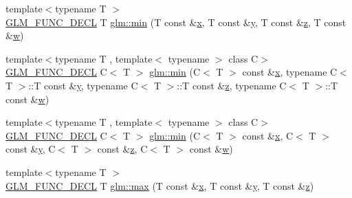 \begin{DoxyCompactItemize}
\item 
{\footnotesize template$<$typename T $>$ }\\\mbox{\hyperlink{setup_8hpp_ab2d052de21a70539923e9bcbf6e83a51}{G\+L\+M\+\_\+\+F\+U\+N\+C\+\_\+\+D\+E\+CL}} T \mbox{\hyperlink{group__gtx__extended__min__max_ga95466987024d03039607f09e69813d69}{glm\+::min}} (T const \&\mbox{\hyperlink{_s_d_l__opengl_8h_ad0e63d0edcdbd3d79554076bf309fd47}{x}}, T const \&\mbox{\hyperlink{_s_d_l__opengl_8h_a1675d9d7bb68e1657ff028643b4037e3}{y}}, T const \&\mbox{\hyperlink{_s_d_l__opengl__glext_8h_a5e74030ebb3297ce1b37ff716fedd68f}{z}}, T const \&\mbox{\hyperlink{_s_d_l__opengl__glext_8h_a6ee8f168a7ab6785a9bb57c6715dad99}{w}})
\item 
{\footnotesize template$<$typename T , template$<$ typename $>$ class C$>$ }\\\mbox{\hyperlink{setup_8hpp_ab2d052de21a70539923e9bcbf6e83a51}{G\+L\+M\+\_\+\+F\+U\+N\+C\+\_\+\+D\+E\+CL}} C$<$ T $>$ \mbox{\hyperlink{group__gtx__extended__min__max_ga4fe35dd31dd0c45693c9b60b830b8d47}{glm\+::min}} (C$<$ T $>$ const \&\mbox{\hyperlink{_s_d_l__opengl_8h_ad0e63d0edcdbd3d79554076bf309fd47}{x}}, typename C$<$ T $>$\+::T const \&\mbox{\hyperlink{_s_d_l__opengl_8h_a1675d9d7bb68e1657ff028643b4037e3}{y}}, typename C$<$ T $>$\+::T const \&\mbox{\hyperlink{_s_d_l__opengl__glext_8h_a5e74030ebb3297ce1b37ff716fedd68f}{z}}, typename C$<$ T $>$\+::T const \&\mbox{\hyperlink{_s_d_l__opengl__glext_8h_a6ee8f168a7ab6785a9bb57c6715dad99}{w}})
\item 
{\footnotesize template$<$typename T , template$<$ typename $>$ class C$>$ }\\\mbox{\hyperlink{setup_8hpp_ab2d052de21a70539923e9bcbf6e83a51}{G\+L\+M\+\_\+\+F\+U\+N\+C\+\_\+\+D\+E\+CL}} C$<$ T $>$ \mbox{\hyperlink{group__gtx__extended__min__max_ga7471ea4159eed8dd9ea4ac5d46c2fead}{glm\+::min}} (C$<$ T $>$ const \&\mbox{\hyperlink{_s_d_l__opengl_8h_ad0e63d0edcdbd3d79554076bf309fd47}{x}}, C$<$ T $>$ const \&\mbox{\hyperlink{_s_d_l__opengl_8h_a1675d9d7bb68e1657ff028643b4037e3}{y}}, C$<$ T $>$ const \&\mbox{\hyperlink{_s_d_l__opengl__glext_8h_a5e74030ebb3297ce1b37ff716fedd68f}{z}}, C$<$ T $>$ const \&\mbox{\hyperlink{_s_d_l__opengl__glext_8h_a6ee8f168a7ab6785a9bb57c6715dad99}{w}})
\item 
{\footnotesize template$<$typename T $>$ }\\\mbox{\hyperlink{setup_8hpp_ab2d052de21a70539923e9bcbf6e83a51}{G\+L\+M\+\_\+\+F\+U\+N\+C\+\_\+\+D\+E\+CL}} T \mbox{\hyperlink{group__gtx__extended__min__max_ga04991ccb9865c4c4e58488cfb209ce69}{glm\+::max}} (T const \&\mbox{\hyperlink{_s_d_l__opengl_8h_ad0e63d0edcdbd3d79554076bf309fd47}{x}}, T const \&\mbox{\hyperlink{_s_d_l__opengl_8h_a1675d9d7bb68e1657ff028643b4037e3}{y}}, T const \&\mbox{\hyperlink{_s_d_l__opengl__glext_8h_a5e74030ebb3297ce1b37ff716fedd68f}{z}})

\end{DoxyCompactItemize}
